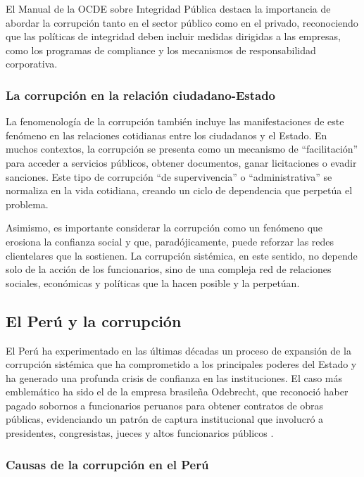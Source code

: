 \documentclass[12pt,a4paper]{article}
\begin{document}
El Manual de la OCDE sobre Integridad Pública \parencite{ocde2020} destaca la importancia de abordar la corrupción tanto en el sector público como en el privado, reconociendo que las políticas de integridad deben incluir medidas dirigidas a las empresas, como los programas de compliance y los mecanismos de responsabilidad corporativa.

\subsubsection{La corrupción en la relación ciudadano-Estado}

La fenomenología de la corrupción también incluye las manifestaciones de este fenómeno en las relaciones cotidianas entre los ciudadanos y el Estado. En muchos contextos, la corrupción se presenta como un mecanismo de ``facilitación'' para acceder a servicios públicos, obtener documentos, ganar licitaciones o evadir sanciones. Este tipo de corrupción ``de supervivencia'' o ``administrativa'' se normaliza en la vida cotidiana, creando un ciclo de dependencia que perpetúa el problema.

Asimismo, es importante considerar la corrupción como un fenómeno que erosiona la confianza social y que, paradójicamente, puede reforzar las redes clientelares que la sostienen. La corrupción sistémica, en este sentido, no depende solo de la acción de los funcionarios, sino de una compleja red de relaciones sociales, económicas y políticas que la hacen posible y la perpetúan.

\subsection{El Perú y la corrupción}

El Perú ha experimentado en las últimas décadas un proceso de expansión de la corrupción sistémica que ha comprometido a los principales poderes del Estado y ha generado una profunda crisis de confianza en las instituciones. El caso más emblemático ha sido el de la empresa brasileña Odebrecht, que reconoció haber pagado sobornos a funcionarios peruanos para obtener contratos de obras públicas, evidenciando un patrón de captura institucional que involucró a presidentes, congresistas, jueces y altos funcionarios públicos \parencite{ocde2020}.

\subsubsection{Causas de la corrupción en el Perú}
\end{document}
